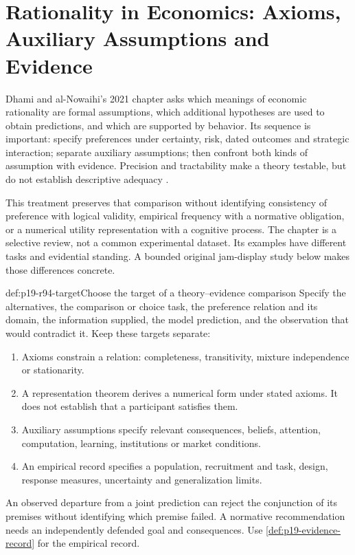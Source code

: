 \chapter{Rationality in Economics: Axioms, Auxiliary Assumptions and Evidence}
\label{sec:p19-rationality-9-4}

Dhami and al-Nowaihi's 2021 chapter asks which meanings of economic
rationality are formal assumptions, which additional hypotheses are used
to obtain predictions, and which are supported by behavior. Its sequence
is important: specify preferences under certainty, risk, dated outcomes
and strategic interaction; separate auxiliary assumptions; then confront
both kinds of assumption with evidence. Precision and tractability make
a theory testable, but do not establish descriptive adequacy
\cite[pp.~565--574]{DhamiAlNowaihi2021Economics}.

This treatment preserves that comparison without identifying consistency
of preference with logical validity, empirical frequency with a normative
obligation, or a numerical utility representation with a cognitive process.
The chapter is a selective review, not a common experimental dataset.
Its examples have different tasks and evidential standing. A bounded
original jam-display study below makes those differences concrete.

\begin{hbmethod}{def:p19-r94-target}{Choose the target of a theory--evidence comparison}
Specify the alternatives, the comparison or choice task, the preference
relation and its domain, the information supplied, the model prediction,
and the observation that would contradict it. Keep these targets separate:
\begin{enumerate}
\item Axioms constrain a relation: completeness, transitivity, mixture
      independence or stationarity.
\item A representation theorem derives a numerical form under stated
      axioms. It does not establish that a participant satisfies them.
\item Auxiliary assumptions specify relevant consequences, beliefs,
      attention, computation, learning, institutions or market conditions.
\item An empirical record specifies a population, recruitment and task,
      design, response measures, uncertainty and generalization limits.
\end{enumerate}
An observed departure from a joint prediction can reject the conjunction
of its premises without identifying which premise failed. A normative
recommendation needs an independently defended goal and consequences.
Use \cref{def:p19-evidence-record} for the empirical record.
\end{hbmethod}

